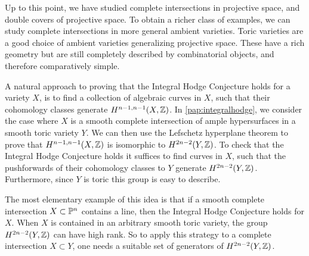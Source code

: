 Up to this point, we have studied complete intersections in projective space, and double covers of projective space. To obtain a richer class of examples, we can study complete intersections in more general ambient varieties. Toric varieties are a good choice of ambient varieties generalizing projective space. These have a rich geometry but are still completely described by combinatorial objects, and therefore comparatively simple.

A natural approach to proving that the Integral Hodge Conjecture holds for a variety $X$, is to find a collection of algebraic curves in $X$, such that their cohomology classes generate $H^{n-1,n-1}(X,\Z)$. In \cref{pap:integralhodge}, we consider the case where $X$ is a smooth complete intersection of ample hypersurfaces in a smooth toric variety $Y$. We can then use the Lefschetz hyperplane theorem to prove that $H^{n-1,n-1}(X,\Z)$ is isomorphic to $H^{2n-2}(Y,\Z)$. To check that the Integral Hodge Conjecture holds it suffices to find curves in $X$, such that the pushforwards of their cohomology classes to $Y$ generate $H^{2n-2}(Y,\Z)$. Furthermore, since $Y$ is toric this group is easy to describe.

The most elementary example of this idea is that if a smooth complete intersection $X \subset \P^n$ contains a line, then the Integral Hodge Conjecture holds for $X$. When $X$ is contained in an arbitrary smooth toric variety, the group $H^{2n-2}(Y,\Z)$ can have high rank. So to apply this strategy to a complete intersection $X \subset Y$, one needs a suitable set of generators of $H^{2n-2}(Y,\Z)$.

